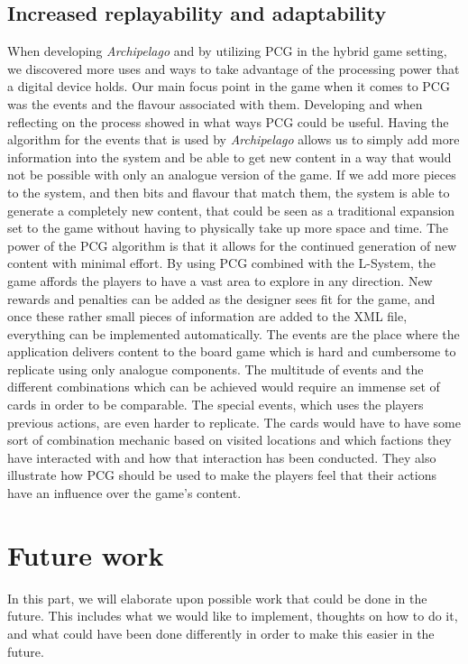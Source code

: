 \subsection{Increased replayability and adaptability}
When developing \textit{Archipelago} and by utilizing PCG in the hybrid game setting, we discovered more uses and ways to take advantage of the processing power that a digital device holds. Our main focus point in the game when it comes to PCG was the events and the flavour associated with them. Developing and when reflecting on the process showed in what ways PCG could be useful. Having the algorithm for the events that is used by \textit{Archipelago} allows us to simply add more information into the system and be able to get new content in a way that would not be possible with only an analogue version of the game. If we add more pieces to the system, and then bits and flavour that match them, the system is able to generate a completely new content, that could be seen as a traditional expansion set to the game without having to physically take up more space and time. The power of the PCG algorithm is that it allows for the continued generation of new content with minimal effort. By using PCG combined with the L-System, the game affords the players to have a vast area to explore in any direction. New rewards and penalties can be added as the designer sees fit for the game, and once these rather small pieces of information are added to the XML file, everything can be implemented automatically. The events are the place where the application delivers content to the board game which is hard and cumbersome to replicate using only analogue components. The multitude of events and the different combinations which can be achieved would require an immense set of cards in order to be comparable. 
The special events, which uses the players previous actions, are even harder to replicate. The cards would have to have some sort of combination mechanic based on visited locations and which factions they have interacted with and how that interaction has been conducted. They also illustrate how PCG should be used to make the players feel that their actions have an influence over the game's content.

\section{Future work}
\label{sec:future}
In this part, we will elaborate upon possible work that could be done in the future. This includes what we would like to implement, thoughts on how to do it, and what could have been done differently in order to make this easier in the future.

